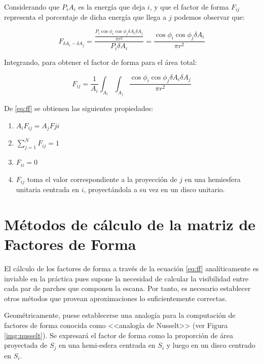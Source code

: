 Considerando que ${P}_{i}{A_{i}}$ es la energía que deja $i$, y que el factor de forma $F_{ij}$ representa el porcentaje de dicha energía que llega a $j$ podemos observar que:

\begin{equation}
    F_{\delta{A_{i}}-\delta{A_{j}}} = \frac{\frac{P_{i}\cos{\phi_{i}}\cos{\phi_{j}}\delta{A_{i}}\delta{A_{j}}}{\pi r^{2}}}{P_{i}\delta{A_{i}}} = \frac{\cos{\phi_{i}}\cos{\phi_{j}}\delta{A_{i}}}{\pi{r^{2}}}
\end{equation}

Integrando, para obtener el factor de forma para el área total:

\begin{equation}
    F_{ij} = \frac{1}{A_{i}} \int_{A_{i}}\int_{A_{j}}\frac{\cos{\phi_{i}}\cos{\phi_{j}}\delta{A_{i}}\delta{A_{j}}}{\pi{r^{2}}} \label{eq:ff}    
\end{equation}

De \eqref{eq:ff} se obtienen las siguientes propiedades:
\begin{enumerate}
	\label{propsff}
    \item $A_{i}F_{ij} = A_{j}F{ji}$
    \item $\sum_{j=1}^{N} F_{ij} = 1$
    \item $F_{ii} = 0$
    \item $F_{ij}$ toma el valor correspondiente a la proyección de $j$ en una hemiesfera unitaria centrada en $i$, proyectándola a su vez en un disco unitario.
\end{enumerate}


\section{Métodos de cálculo de la matriz de Factores de Forma}
\label{sec:calculoff}

El cálculo de los factores de forma a través de la ecuación \eqref{eq:ff} analíticamente es inviable en la práctica pues supone la necesidad de calcular la visibilidad entre cada par de parches que componen la escana. Por tanto, es necesario establecer otros métodos que provean aproximaciones lo suficientemente correctas.

Geométricamente, puese establecerse una analogía para la computación de factores de forma conocida como <<analogía de Nusselt>> (ver Figura \ref{img:nusselt}). Se expresará el factor de forma como la proporción de área proyectada de $S_{j}$ en una hemi-esfera centrada en $S_{i}$ y luego en un disco centrado en $S_{i}$.

